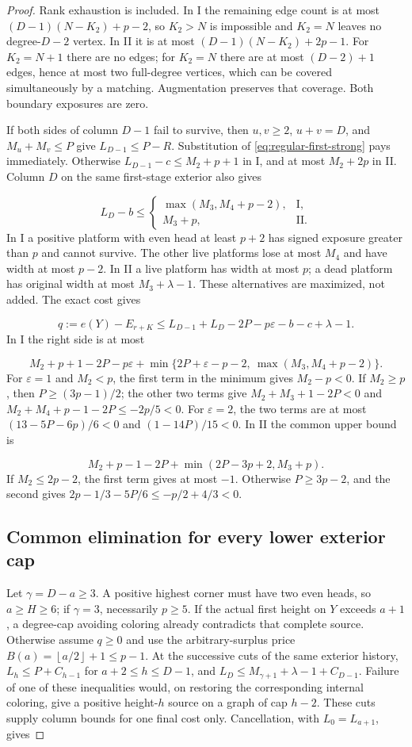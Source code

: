 \documentclass[11pt,a4paper]{article}
\newcommand{\floor}[1]{\left\lfloor#1\right\rfloor}
\theoremstyle{definition}
\begin{document}
\begin{proof}
Rank exhaustion is included. In I the remaining edge count is at most
$(D-1)(N-K_2)+p-2$, so $K_2>N$ is impossible and $K_2=N$ leaves no degree-$D-2$ vertex.
In II it is at most $(D-1)(N-K_2)+2p-1$.
For $K_2=N+1$ there are no edges; for $K_2=N$ there are at most $(D-2)+1$ edges,
hence at most two full-degree vertices, which can be covered simultaneously
by a matching. Augmentation preserves that coverage. Both boundary exposures are zero.

If both sides of column $D-1$ fail to survive, then
$u,v\ge2$, $u+v=D$, and $M_u+M_v\le P$ give $L_{D-1}\le P-R$.
Substitution of \eqref{eq:regular-first-strong} pays immediately.
Otherwise $L_{D-1}-c\le M_2+p+1$ in I, and at most $M_2+2p$ in II.
Column $D$ on the same first-stage exterior also gives

\[
L_D-b\le
\begin{cases}
\max(M_3,M_4+p-2),&\mathrm I,\\
M_3+p,&\mathrm {II}.
\end{cases}
\]
In I a positive platform with even head at least $p+2$ has signed
exposure greater than $p$ and cannot survive.
The other live platforms lose at most $M_4$ and have width at most $p-2$.
In II a live platform has width at most $p$; a dead platform has
original width at most $M_3+\lambda-1$. These alternatives are maximized, not added.
The exact cost gives

\[
q:=e(Y)-E_{r+K}\le
L_{D-1}+L_D-2P-p\varepsilon-b-c+\lambda-1.
\]
In I the right side is at most

\[
M_2+p+1-2P-p\varepsilon+
\min\{2P+\varepsilon-p-2,\ \max(M_3,M_4+p-2)\}.
\]
For $\varepsilon=1$ and $M_2<p$, the first term in the minimum gives $M_2-p<0$.
If $M_2\ge p$, then $P\ge(3p-1)/2$; the other two terms give
$M_2+M_3+1-2P<0$ and
$M_2+M_4+p-1-2P\le-2p/5<0$.
For $\varepsilon=2$, the two terms are at most
$(13-5P-6p)/6<0$ and $(1-14P)/15<0$.
In II the common upper bound is

\[
M_2+p-1-2P+\min(2P-3p+2,M_3+p).
\]
If $M_2\le2p-2$, the first term gives at most $-1$.
Otherwise $P\ge3p-2$, and the second gives
$2p-1/3-5P/6\le-p/2+4/3<0$.

\subsection*{Common elimination for every lower exterior cap}
Let $\gamma=D-a\ge3$.
A positive highest corner must have two even heads, so $a\ge H\ge6$;
if $\gamma=3$, necessarily $p\ge5$.
If the actual first height on $Y$ exceeds $a+1$, a degree-cap avoiding
coloring already contradicts that complete source.
Otherwise assume $q\ge0$ and use the arbitrary-surplus price
$B(a)=\floor{a/2}+1\le p-1$.
At the successive cuts of the same exterior history,
$L_h\le P+C_{h-1}$ for $a+2\le h\le D-1$, and
$L_D\le M_{\gamma+1}+\lambda-1+C_{D-1}$.
Failure of one of these inequalities would, on restoring the corresponding
internal coloring, give a positive height-$h$ source on a graph of cap $h-2$.
These cuts supply column bounds for one final cost only.
Cancellation, with $L_0=L_{a+1}$, gives


\end{proof}
\end{document}
